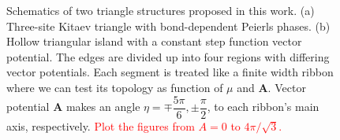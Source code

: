 \documentclass[aps,prb,showpacs,amsmath,twocolumn,amssymb,superscriptaddress]{revtex4-2}
\newcommand{\Red}[1]{\textcolor{red}{#1}}
\renewcommand{\vec}[1]{\mathbf{#1}}
\begin{document}
\begin{figure}[]
  \caption{Schematics of two triangle structures proposed in this work. (a) Three-site Kitaev triangle with bond-dependent Peierls phases. (b) Hollow triangular island with a constant step function vector potential. The edges are divided up into four regions with differing vector potentials. Each segment is treated like a finite width ribbon where we can test its topology as function of $\mu$ and $\vec{A}$. Vector potential $\vec{A}$ makes an angle $\eta =  \mp \dfrac{5\pi}{6}, \pm \dfrac{\pi}{2}$, to each ribbon's main axis, respectively. \Red{Plot the figures from $A=0$ to $4\pi/\sqrt{3}$.}}
  \label{fig: triangular-island-vector-potential-divided}
\end{figure}
\end{document}
